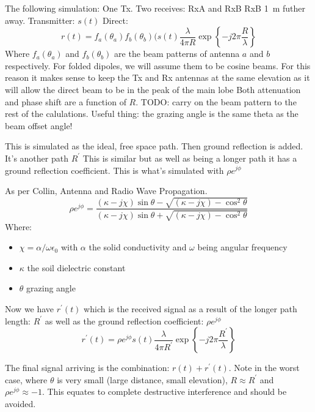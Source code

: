 The following simulation:
One Tx.
Two receives: RxA and RxB
RxB \SI{1}{\meter} futher away. 
Transmitter: \(s(t)\)
Direct:
\begin{equation}
  r(t) = f_a(\theta_a)f_b(\theta_b)(s(t)\frac{\lambda}{4\pi R} \exp\left\{ -j 2 \pi \frac{R}{\lambda}\right\}
\end{equation}
Where \(f_a(\theta_a)\) and \(f_b(\theta_b)\) are the beam patterns of antenna \(a\) and \(b\) respectively. For folded dipoles, we will assume them to be cosine beams. For this reason it makes sense to keep the Tx and Rx antennas at the same elevation as it will allow the direct beam to be in the peak of the main lobe
Both attenuation and phase shift are a function of \(R\).
TODO: carry on the beam pattern to the rest of the calulations. Useful thing: the grazing angle is the same theta as the beam offset angle!

This is simulated as the ideal, free space path.
Then ground reflection is added. It's another path \(R^\prime\)
This is similar but as well as being a longer path it has a ground reflection coefficient. 
This is what's simulated with \(\rho e^{j \phi}\)

As per Collin, Antenna and Radio Wave Propagation.
\begin{equation}
  \rho e^{j\phi} = \frac
    {(\kappa - j\chi)\sin\theta - \sqrt{(\kappa -j\chi) - \cos^2\theta}}
    {(\kappa - j\chi)\sin\theta + \sqrt{(\kappa -j\chi) - \cos^2\theta}}
\end{equation}
Where:
\begin{itemize}
  \item \(\chi = \alpha/\omega\epsilon_0\) with \(\alpha\) the solid conductivity and \(\omega\) being angular frequency
  \item \(\kappa\) the soil dielectric constant
  \item \(\theta\) grazing angle
\end{itemize}

Now we have \(r^\prime(t)\) which is the received signal as a result of the longer path length: \(R^\prime\) as well as the ground reflection coefficient: \(\rho e^{j\phi}\)
\begin{equation}
  r^\prime(t) = \rho e^{j\phi} s(t)\frac{\lambda}{4\pi R^\prime} \exp\left\{ -j 2 \pi \frac{R^\prime}{\lambda}\right\}
\end{equation}

The final signal arriving is the combination: \(r(t) + r^\prime(t)\).
Note in the worst case, where \(\theta\) is very small (large distance, small elevation), \(R \approx R^\prime\) and \(\rho e^{j\phi} \approx -1\). This equates to complete destructive interference and should be avoided.

